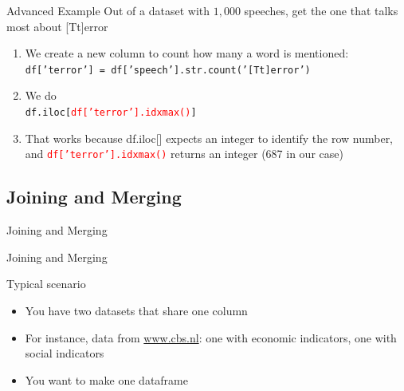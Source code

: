 \documentclass[handout]{beamer}
\begin{document}
\begin{frame}{Advanced Example}
Out of a dataset with $1,000$ speeches, get the one that talks most about [Tt]error
\begin{enumerate}[<+->]
	\item We create a new column to count how many a word is mentioned: \\ 
	\texttt{df['terror'] = df['speech'].str.count('[Tt]error')}
	\item We do \\ \texttt{df.iloc[\textcolor{red}{df['terror'].idxmax()}]}
	\item That works because df.iloc[] expects an integer to identify the row number, and \texttt{\textcolor{red}{df['terror'].idxmax()}} returns an integer (687 in our case)
\end{enumerate}

\end{frame}

{
	\begin{frame}[plain]
\end{frame}
}


\subsection{Joining and Merging}
\begin{frame}[plain]
Joining and Merging
\end{frame}


\begin{frame}{Joining and Merging}
\begin{block}{Typical scenario}
	\begin{itemize}
		\item You have two datasets that share one column
		\item For instance, data from \url{www.cbs.nl}: one with economic indicators, one with social indicators
		\item You want to make one dataframe
	\end{itemize}
\end{block}
\end{frame}
\end{document}
